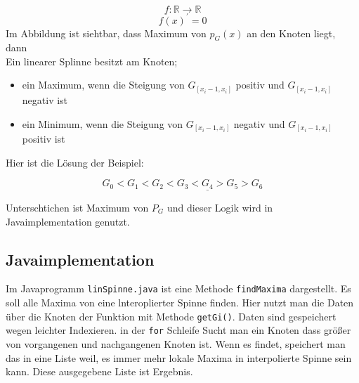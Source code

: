  $$f: \mathbb{R} \to \mathbb{R}$$
$$ f(x)^{\prime} = 0$$
Im Abbildung ist siehtbar, dass Maximum von $p_G(x)$ an den Knoten liegt, dann\\
Ein linearer Splinne besitzt am Knoten;
\begin{itemize}
\item ein Maximum, wenn die Steigung von $G_{[x_i -1, x_i]}$ positiv und $G_{[x_i -1, x_i]}$ negativ ist

\item ein Minimum, wenn die Steigung von $G_{[x_i -1, x_i]}$ negativ und $G_{[x_i -1, x_i]}$ positiv ist
\end{itemize}

Hier ist die Lösung der Beispiel:

$$G_0 < G_1 <G_2 <G_3 <\underline{G_4}> G_5 > G_6$$

Unterschtichen ist Maximum von $P_G$ und dieser Logik wird in Javaimplementation genutzt.  
\subsection{Javaimplementation}
Im Javaprogramm  \verb|linSpinne.java| ist eine Methode \verb|findMaxima|  dargestellt.
Es soll  alle Maxima von eine lnteroplierter Spinne finden. Hier nutzt man die Daten über die Knoten der Funktion mit Methode \verb|getGi()|.
Daten sind gespeichert wegen leichter Indexieren. in der \verb|for| Schleife Sucht man ein Knoten dass größer von vorgangenen und nachgangenen Knoten ist. Wenn es findet, speichert man das in eine Liste weil, es immer mehr lokale Maxima in interpolierte Spinne sein kann. Diese ausgegebene Liste ist Ergebnis.


